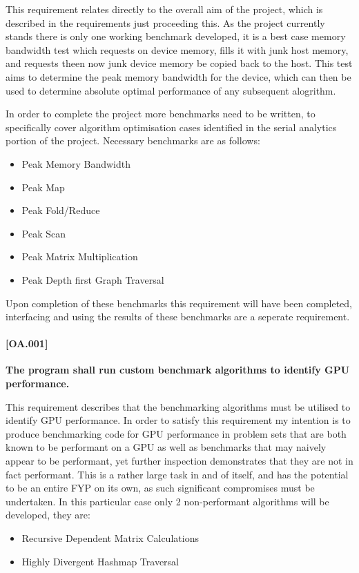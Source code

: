 This requirement relates directly to the overall aim of the project, which is described in the requirements just proceeding this. As the project currently stands there is only one working benchmark developed, it is a best case memory bandwidth test which requests on device memory, fills it with junk host memory, and requests theen now junk device memory be copied back to the host. This test aims to determine the peak memory bandwidth for the device, which can then be used to determine absolute optimal performance of any subsequent alogrithm.

In order to complete the project more benchmarks need to be written, to specifically cover algorithm optimisation cases identified in the serial analytics portion of the project. Necessary benchmarks are as follows: 

\begin{itemize}
\item Peak Memory Bandwidth
\item Peak Map
\item Peak Fold/Reduce
\item Peak Scan
\item Peak Matrix Multiplication
\item Peak Depth first Graph Traversal
\end{itemize}

Upon completion of these benchmarks this requirement will have been completed, interfacing and using the results of these benchmarks are a seperate requirement.

\paragraph{[OA.001]}
\textbf{The program shall run custom benchmark algorithms to identify GPU
performance.}

This requirement describes that the benchmarking algorithms must be utilised to identify GPU performance. In order to satisfy this requirement my intention is to produce benchmarking code for GPU performance in problem sets that are both known to be performant on a GPU as well as benchmarks that may naively appear to be performant, yet further inspection demonstrates that they are not in fact performant. This is a rather large task in and of itself, and has the potential to be an entire FYP on its own, as such significant compromises must be undertaken. In this particular case only 2 non-performant algorithms will be developed, they are:

\begin{itemize}
\item Recursive Dependent Matrix Calculations
\item Highly Divergent Hashmap Traversal 
\end{itemize}

